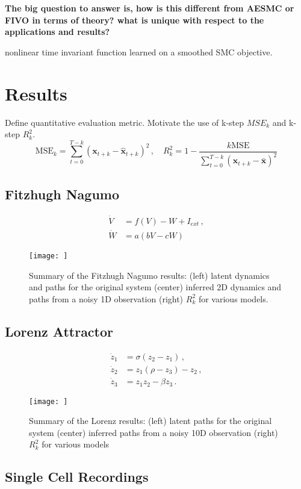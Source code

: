 \documentclass{article}
\newcommand{\be}{\begin{equation}}
\newcommand{\ee}{\end{equation}}
\newcommand{\trm}[1]{\textrm{#1}}
\newcommand{\mbf}[1]{\mathbf{#1}}
\newcommand{\bx}{\mbf{x}}
\newcommand{\nn}{\nonumber}
\begin{document}
\textbf{The big question to answer is, how is this different from AESMC or FIVO in terms of theory? what is unique with respect to the applications and results?} 

nonlinear time invariant function learned on a smoothed SMC objective.


\section{Results}
Define quantitative evaluation metric. Motivate the use of k-step $MSE_k$ and k-step $R^2_k$.
\be
\trm{MSE}_k =  \sum_{t=0}^{T-k} \left( \bx_{t+k} - \hat{\bx}_{t+k} \right)^2 \,,\quad R^2_k = 1 - \frac{k\trm{MSE}}{\sum_{t=0}^{T-k} \left( \bx_{t+k} - \bar{\bx} \right)^2}
\ee

\subsection{Fitzhugh Nagumo}

\begin{align}
\dot V &= f(V) - W + I_{ext} \,, \nn\\
\dot W &= a(bV - cW)
\end{align}

\begin{figure*}
\texttt{[image: ]}
\caption{Summary of the Fitzhugh Nagumo results: (left) latent dynamics and paths for the original system (center) inferred 2D dynamics and paths from a noisy 1D observation (right) $R^2_k$ for various models.}
\end{figure*}


\subsection{Lorenz Attractor}
\begin{align}
  \dot{z}_1 & = \sigma(z_2-z_1) \,, \nn \\
  \dot{z}_2 & = z_1(\rho - z_3) - z_2 \,, \\
  \dot{z}_3 & = z_1z_2 - \beta z_3\,. \nn
\end{align}
\begin{figure*}
\texttt{[image: ]}
\caption{Summary of the Lorenz results: (left) latent paths for the original system (center) inferred paths from a noisy 10D observation (right) $R^2_k$ for various models}
\end{figure*}

\subsection{Single Cell Recordings}
\end{document}
